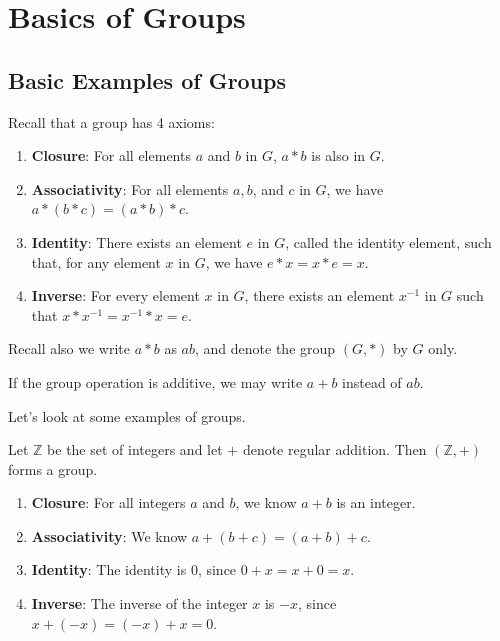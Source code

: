 \chapter{Basics of Groups}
\section{Basic Examples of Groups}
Recall that a group has 4 axioms:
\begin{enumerate}
    \item \textbf{Closure}: For all elements $a$ and $b$ in $G$, $a \ast b$ is also in $G$.
    \item \textbf{Associativity}: For all elements $a, b$, and $c$ in $G$, we have $a \ast (b \ast c) = (a \ast b) \ast c$.
    \item \textbf{Identity}: There exists an element $e$ in $G$, called the identity element, such that, for any element $x$ in $G$, we have $e \ast x = x \ast e = x$.
    \item \textbf{Inverse}: For every element $x$ in $G$, there exists an element $x^{-1}$ in $G$ such that $x \ast x^{-1} = x^{-1} \ast x = e$.
\end{enumerate}

Recall also we write $a \ast b$ as $ab$, and denote the group $(G, \ast)$ by $G$ only.

\begin{remark}
    If the group operation is additive, we may write $a + b$ instead of $ab$.
\end{remark}

Let's look at some examples of groups.

\newpage

\begin{example}
    Let $\mathbb{Z}$ be the set of integers and let $+$ denote regular addition. Then $(\mathbb{Z}, +)$ forms a group.
    \begin{enumerate}
        \item \textbf{Closure}: For all integers $a$ and $b$, we know $a + b$ is an integer.
        \item \textbf{Associativity}: We know $a + (b + c) = (a + b) + c$.
        \item \textbf{Identity}: The identity is 0, since $0 + x = x + 0 = x$.
        \item \textbf{Inverse}: The inverse of the integer $x$ is $-x$, since $x + (-x) = (-x) + x = 0$.
    \end{enumerate}
\end{example}

